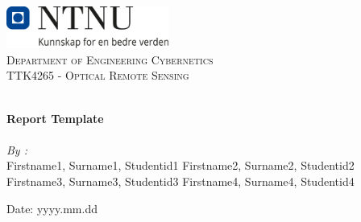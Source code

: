 
\begin{titlepage}
\vbox{ }
\vbox{ }
\begin{center}
\includegraphics[width=0.40\textwidth]{Images/NTNU_logo.png}\\[1cm]
\textsc{\LARGE Department of Engineering Cybernetics}\\[1.5cm]
\textsc{\Large TTK4265 - Optical Remote Sensing}\\[0.5cm]
\vbox{ }

\HRule \\[0.4cm]
{ \huge \bfseries Report Template}\\[0.4cm]
\HRule \\[1.5cm]

\large
\emph{By :}\\
\vfill
Firstname1, Surname1, \qquad Studentid1 \newline
Firstname2, Surname2, \qquad Studentid2 \newline
Firstname3, Surname3, \qquad Studentid3 \newline
Firstname4, Surname4, \qquad Studentid4 \newline
\vfill

{\large Date: yyyy.mm.dd}
\end{center}
\end{titlepage}